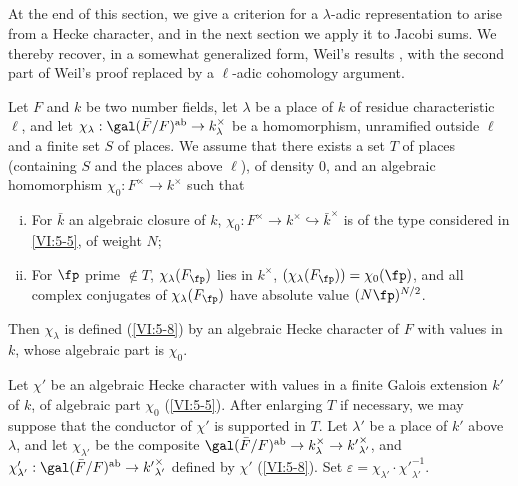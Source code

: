 \documentclass[oneside]{book}
\begin{document}
\subsection{}\label{VI:5-9}

At the end of this section, we give a criterion for a 
$\lambda$-adic representation to arise from a Hecke character, 
and in the next section we apply it to Jacobi sums. We 
thereby recover, in a somewhat generalized form, Weil's results 
\cite{we52,we74-2}, with the second part of Weil's proof 
replaced by a $\ell$-adic cohomology argument. 





\begin{theorem_}\label{VI:5-10}
Let $F$ and $k$ be two number fields, let $\lambda$ be a place of $k$ of 
residue characteristic $\ell$, and let 
$\chi_\lambda:\gal(\bar F/F)^\textnormal{ab}\to k_\lambda^\times$ be a 
homomorphism, unramified outside $\ell$ and a finite set $S$ of 
places. We assume that there exists a set $T$ of places (containing $S$ and the 
places above $\ell$), of density $0$, and an algebraic homomorphism 
$\chi_0:F^\times \to k^\times$ such that 
\begin{enumerate}[(i)]
  \item For $\bar k$ an algebraic closure of $k$, 
    $\chi_0:F^\times \to k^\times \hookrightarrow \bar k^\times$ is of the type 
    considered in \ref{VI:5-5}, of weight $N$; 
  \item For $\fp$ prime $\notin T$, $\chi_\lambda(F_\fp)$ lies in 
    $k^\times$, $(\chi_\lambda(F_\fp))=\chi_0(\fp)$, and all complex conjugates 
    of $\chi_\lambda(F_\fp)$ have absolute value $(N \fp)^{N/2}$. 
\end{enumerate}

Then $\chi_\lambda$ is defined (\ref{VI:5-8}) by an algebraic Hecke character 
of $F$ with values in $k$, whose algebraic part is $\chi_0$. 
\end{theorem_}

Let $\chi'$ be an algebraic Hecke character with values in a 
finite Galois extension $k'$ of $k$, of algebraic part $\chi_0$ 
(\ref{VI:5-5}). After enlarging $T$ if necessary, we may suppose that the conductor of 
$\chi'$ is supported in $T$. Let $\lambda'$ be a place of $k'$ above 
$\lambda$, and let $\chi_{\lambda'}$ be the composite 
$\gal(\bar F/F)^\text{ab}\to k_\lambda^\times \to {k'}_{\lambda'}^\times$, and 
$\chi_{\lambda'}':\gal(\bar F/F)^\text{ab}\to {k'}_{\lambda'}^\times$ defined 
by $\chi'$ (\ref{VI:5-8}). Set 
$\varepsilon = \chi_{\lambda'} \cdot {\chi'}_{\lambda'}^{-1}$.
\end{document}
